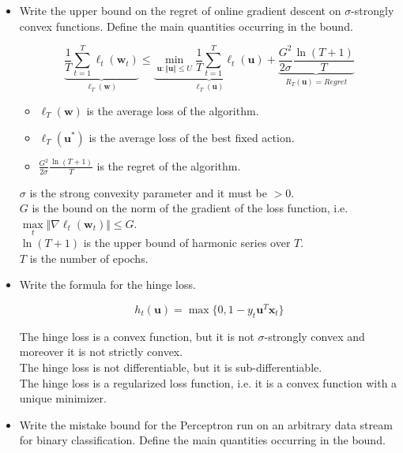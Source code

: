 \begin{itemize}
    \item Write the upper bound on the regret of online gradient descent on $\sigma$-strongly convex functions. Define the main quantities occurring in the bound.

        $$
        \underbrace{\frac{1}{T} \sum_{t=1}^{T} \ell_{t}(\boldsymbol{w}_{t})}_{\ell_T(\boldsymbol{w})} \leq \underbrace{\min_{\boldsymbol{u} : \Vert \boldsymbol{u} \Vert \leq U} \frac{1}{T} \sum_{t=1}^{T} \ell_{t}(\boldsymbol{u})}_{\ell_T(\boldsymbol{u})} + \underbrace{\frac{G^2}{2\sigma} \frac{\ln({T + 1})}{T}}_{R_T(\boldsymbol{u}) = Regret}
        $$

        \begin{itemize}
            \item $\ell_T(\boldsymbol{w})$ is the average loss of the algorithm.
            \item $\ell_T(\boldsymbol{u^*})$ is the average loss of the best fixed action.
            \item $\frac{G^2}{2\sigma} \frac{\ln({T + 1})}{T}$ is the regret of the algorithm.
        \end{itemize}
       
        $\sigma$ is the strong convexity parameter and it must be $> 0$.\\
        $G$ is the bound on the norm of the gradient of the loss function, i.e. $\underset{t}{\max} \Vert \nabla \ell_{t}(\boldsymbol{w}_{t}) \Vert \leq G$.\\
        $\ln(T + 1)$ is the upper bound of harmonic series over $T$.\\
        $T$ is the number of epochs.


        \item Write the formula for the hinge loss.

        $$
        h_{t}(\boldsymbol{u}) = \max\{0, 1 - y_{t} \boldsymbol{u}^T \boldsymbol{x}_{t}\}
        $$

        The hinge loss is a convex function, but it is not $\sigma$-strongly convex and moreover it is not strictly convex.\\
        The hinge loss is not differentiable, but it is sub-differentiable.\\
        The hinge loss is a regularized loss function, i.e. it is a convex function with a unique minimizer.\\

        \item Write the mistake bound for the Perceptron run on an arbitrary data stream for binary classification. Define the main quantities occurring in the bound.
        

\end{itemize}
